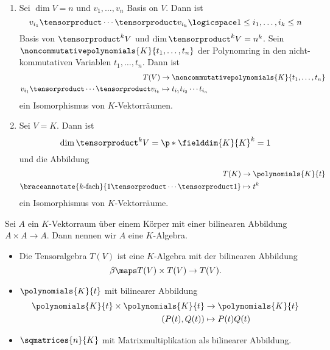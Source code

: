 \begin{beispiele*}
  \begin{enumerate}
    \item Sei \( \dim{V}=n \) und \( v_1,\dotsc,v_n \) Basis on \( V \). Dann ist
    \begin{equation*}
      v_{i_1}\tensorproduct \dotsb \tensorproduct v_{i_k}\logicspace 1\leq i_1,\dotsc,i_k\leq n
    \end{equation*}
    Basis von \( \tensorproduct^k V \) und \( \dim{\tensorproduct^k V}=n^k \). Sein \( \noncommutativepolynomials{K}{t_1,\dotsc, t_n} \) der Polynomring in den nicht-kommutativen Variablen \( t_1,\dotsc,t_n \).  Dann ist
    \begin{align*}
      T(V)&\to \noncommutativepolynomials{K}{t_1,\dotsc,t_n}\\
      v_{i_1}\tensorproduct\dotsb \tensorproduct v_{i_k}&\mapsto t_{i_1}t_{i_2}\dotsm t_{i_n}
    \end{align*}
    ein Isomorphismus von \( K \)-Vektorräumen.
    \item Sei \( V=K \). Dann ist
    \begin{equation*}
      \dim{\tensorproduct^k V}=\p*{\fielddim{K}{K}}^k=1
    \end{equation*}
    und die Abbildung
    \begin{align*}
      T(K)&\to \polynomials{K}{t}\\
      \braceannotate{\text{\( k \)-fach}}{1\tensorproduct\dotsb \tensorproduct 1}&\mapsto t^k
    \end{align*}
    ein Isomorphismus von \( K \)-Vektorräume.
  \end{enumerate}
\end{beispiele*}
\begin{definition*}
  Sei \( A \) ein \( K \)-Vektorraum über einem Körper mit einer bilinearen Abbildung \( A\times A\to A \). Dann nennen wir \( A \) eine \( K \)-Algebra.
\end{definition*}
\begin{beispiel*}
  \begin{itemize}
    \item Die Tensoralgebra \( T(V) \) ist eine \( K \)-Algebra mit der bilinearen Abbildung
    \begin{equation*}
      \beta\maps T(V)\times T(V)\to T(V).
    \end{equation*}
    \item \( \polynomials{K}{t} \) mit bilinearer Abbildung
    \begin{align*}
      \polynomials{K}{t}\times \polynomials{K}{t}&\to \polynomials{K}{t}\\
      (P(t),Q(t))&\mapsto P(t)Q(t)
    \end{align*}
    \item \( \sqmatrices{n}{K} \) mit Matrixmultiplikation als bilinearer Abbildung.
  \end{itemize}
\end{beispiel*}